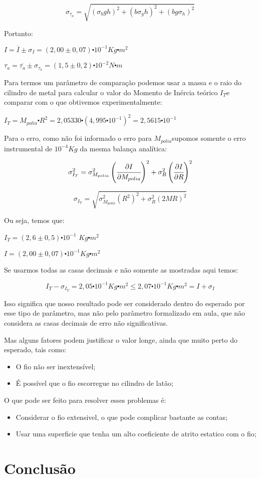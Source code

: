 \documentclass{article}
\begin{document}
\[
\sigma_{\tau_{a}}=\sqrt{(\sigma_{b}gh)^{2}+(b\sigma_{g}h)^{2}+(bg\sigma_{h})^{2}}
\]


Portanto:

$I=\overline{I}\pm\sigma_{I}=(2,00\pm0,07)\centerdot10^{-1}$$Kg\centerdot m^{2}$

$\tau_{a}=\overline{\tau_{a}}\pm\sigma_{\tau_{a}}=(1,5\pm0,2)\centerdot10^{-2}$$N\centerdot m$

Para termos um parâmetro de comparação podemos usar a massa e o raio
do cilindro de metal para calcular o valor do Momento de Inércia teórico
$I_{T}$e comparar com o que obtivemos experimentalmente:

$I_{T}=M_{polia}\centerdot R^{2}=2,05330\centerdot(4,995\centerdot10^{-1})^{2}=2,5615\centerdot10^{-1}$

Para o erro, como não foi informado o erro para $M_{polia}$supomos
somente o erro instrumental de $10^{-4}$$Kg$ da mesma balança analítica:

\[
\sigma_{I_{T}}^{2}=\sigma_{M_{polia}}^{2}\left(\cfrac{\partial I}{\partial M_{polia}}\right)^{2}+\sigma_{R}^{2}\left(\cfrac{\partial I}{\partial R}\right)^{2}
\]


\[
\sigma_{I_{T}}=\sqrt{\sigma_{M_{polia}}^{2}\left(R^{2}\right)^{2}+\sigma_{R}^{2}\left(2MR\right)^{2}}
\]


Ou seja, temos que:

$I_{T}=(2,6\pm0,5)\centerdot10^{-1}$ $Kg\centerdot m^{2}$

$I=$$(2,00\pm0,07)\centerdot10^{-1}$$Kg\centerdot m^{2}$

Se usarmos todas as casas decimais e não somente as mostradas aqui
temos:

\[
I_{T}-\sigma_{I_{T}}=2,05\centerdot10^{-1}Kg\centerdot m^{2}\leq2,07\centerdot10^{-1}Kg\centerdot m^{2}=I+\sigma_{I}
\]


Isso significa que nosso resultado pode ser considerado dentro do
esperado por esse tipo de parâmetro, mas não pelo parâmetro formalizado
em aula, que não considera as casas decimais de erro não significativas.

Mas alguns fatores podem justificar o valor longe, ainda que muito
perto do esperado, tais como:
\begin{itemize}
	\item O fio não ser inextensível;
	\item É possível que o fio escorregue no cilindro de latão;
\end{itemize}
O que pode ser feito para resolver esses problemas é:
\begin{itemize}
	\item Considerar o fio extensivel, o que pode complicar bastante as contas;
	\item Usar uma superficie que tenha um alto coeficiente de atrito estatico
com o fio;
\end{itemize}

\section{Conclusão}
\end{document}
